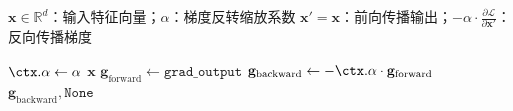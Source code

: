 \begin{algorithm}
  \centering
  \caption{梯度反转层（Gradient Reversal Layer）}
  \label{alg:grl}
  \small
  \begin{algorithmic}[1]
  \REQUIRE $\mathbf{x} \in \mathbb{R}^d$：输入特征向量；$\alpha$：梯度反转缩放系数
  \ENSURE $\mathbf{x}' = \mathbf{x}$：前向传播输出；$-\alpha \cdot \frac{\partial \mathcal{L}}{\partial \mathbf{x}'}$：反向传播梯度

  \STATE {}
  \STATE $\ctx.\alpha \leftarrow \alpha$
  \STATE \RETURN $\mathbf{x}$
  \STATE {}
  \STATE $\mathbf{g}_{\text{forward}} \leftarrow \texttt{grad\_output}$
  \STATE $\mathbf{g}_{\text{backward}} \leftarrow -\ctx.\alpha \cdot \mathbf{g}_{\text{forward}}$
  \STATE \RETURN $\mathbf{g}_{\text{backward}}, \texttt{None}$
  \end{algorithmic}
\end{algorithm}

